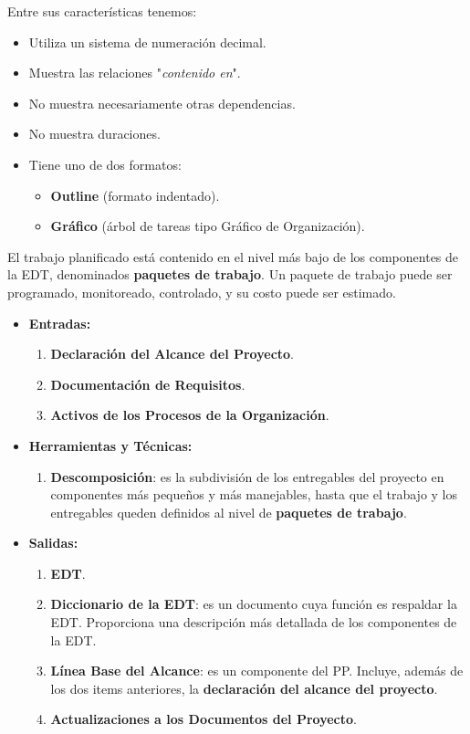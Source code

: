 \documentclass[10pt,a4paper]{article}
\begin{document}
Entre sus características tenemos:
\begin{itemize}
\item Utiliza un sistema de numeración decimal.
\item Muestra las relaciones "\textit{contenido en}".
\item No muestra necesariamente otras dependencias.
\item No muestra duraciones.
\item Tiene uno de dos formatos:
\begin{itemize}
\item \textbf{Outline} (formato indentado).
\item \textbf{Gráfico} (árbol de tareas tipo Gráfico de Organización).       
\end{itemize}
\end{itemize}

El trabajo planificado está contenido en el nivel más bajo de los componentes de la EDT, denominados \textbf{paquetes de trabajo}. Un paquete de trabajo puede ser programado, monitoreado, controlado, y su costo puede ser estimado.

\begin{itemize}
\item \textbf{Entradas:}
\begin{enumerate}
\item \textbf{Declaración del Alcance del Proyecto}.
\item \textbf{Documentación de Requisitos}.
\item \textbf{Activos de los Procesos de la Organización}.
\end{enumerate}

\item \textbf{Herramientas y Técnicas:}
\begin{enumerate}
\item \textbf{Descomposición}: es la subdivisión de los entregables del proyecto en componentes más pequeños y más manejables, hasta que el trabajo y los entregables queden definidos al nivel de \textbf{paquetes de trabajo}.
\end{enumerate}

\item \textbf{Salidas:}
\begin{enumerate}
\item \textbf{EDT}.
\item \textbf{Diccionario de la EDT}: es un documento cuya función es respaldar la EDT. Proporciona una descripción más detallada de los componentes de la EDT.
\item \textbf{Línea Base del Alcance}: es un componente del PP. Incluye, además de los dos items anteriores, la \textbf{declaración del alcance del proyecto}.
\item \textbf{Actualizaciones a los Documentos del Proyecto}.
\end{enumerate}
\end{itemize}
\end{document}

